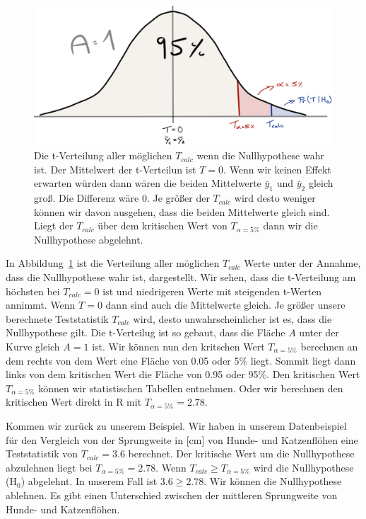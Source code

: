 \documentclass[
  letterpaper,
  DIV=11,
  oneside]{scrreport}
\begin{document}
\begin{figure}

{\centering \includegraphics{./images/t-verteilung_01.png}

}

\caption{\label{fig-teststatistik-01}Die t-Verteilung aller möglichen
\(T_{calc}\) wenn die Nullhypothese wahr ist. Der Mittelwert der
t-Verteilun ist \(T=0\). Wenn wir keinen Effekt erwarten würden dann
wären die beiden Mittelwerte \(\bar{y}_1\) und \(\bar{y}_2\) gleich
groß. Die Differenz wäre 0. Je größer der \(T_{calc}\) wird desto
weniger können wir davon ausgehen, dass die beiden Mittelwerte gleich
sind. Liegt der \(T_{calc}\) über dem kritischen Wert von
\(T_{\alpha = 5\%}\) dann wir die Nullhypothese abgelehnt.}

\end{figure}

In Abbildung~\ref{fig-teststatistik-01} ist die Verteilung aller
möglichen \(T_{calc}\) Werte unter der Annahme, dass die Nullhypothese
wahr ist, dargestellt. Wir sehen, dass die t-Verteilung am höchsten bei
\(T_{calc} = 0\) ist und niedrigeren Werte mit steigenden t-Werten
annimmt. Wenn \(T = 0\) dann sind auch die Mittelwerte gleich. Je größer
unsere berechnete Teststatistik \(T_{calc}\) wird, desto
unwahrscheinlicher ist es, dass die Nullhypothese gilt. Die t-Verteilug
ist so gebaut, dass die Fläche \(A\) unter der Kurve gleich \(A=1\) ist.
Wir können nun den kritschen Wert \(T_{\alpha = 5\%}\) berechnen an dem
rechts von dem Wert eine Fläche von 0.05 oder 5\% liegt. Sommit liegt
dann links von dem kritischen Wert die Fläche von 0.95 oder 95\%. Den
kritischen Wert \(T_{\alpha = 5\%}\) können wir statistischen Tabellen
entnehmen. Oder wir berechnen den kritischen Wert direkt in R mit
\(T_{\alpha = 5\%} = 2.78\).

Kommen wir zurück zu unserem Beispiel. Wir haben in unserem
Datenbeispiel für den Vergleich von der Sprungweite in {[}cm{]} von
Hunde- und Katzenflöhen eine Teststatistik von \(T_{calc} = 3.6\)
berechnet. Der kritische Wert um die Nullhypothese abzulehnen liegt bei
\(T_{\alpha = 5\%} = 2.78\). Wenn \(T_{calc} \geq T_{\alpha = 5\%}\)
wird die Nullhypothese (H\(_0\)) abgelehnt. In unserem Fall ist
\(3.6 \geq 2.78\). Wir können die Nullhypothese ablehnen. Es gibt einen
Unterschied zwischen der mittleren Sprungweite von Hunde- und
Katzenflöhen.
\end{document}
